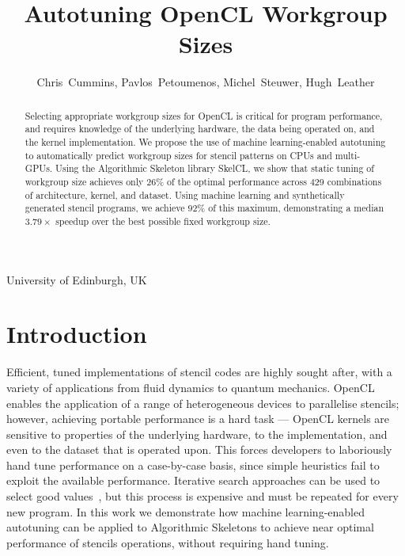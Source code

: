 \documentclass[hidelinks]{acaces}
\begin{document}
\title{Autotuning OpenCL Workgroup Sizes}

\author{
Chris~Cummins,
Pavlos~Petoumenos,
Michel~Steuwer,
Hugh~Leather
}

\address{1}{
University of Edinburgh,
UK
}

%

\pagestyle{empty}


\begin{abstract}
  Selecting appropriate workgroup sizes for OpenCL is critical for
  program performance, and requires knowledge of the underlying
  hardware, the data being operated on, and the kernel
  implementation. We propose the use of machine learning-enabled
  autotuning to automatically predict workgroup sizes for stencil
  patterns on CPUs and multi-GPUs. Using the Algorithmic Skeleton
  library SkelCL, we show that static tuning of workgroup size
  achieves only $26\%$ of the optimal performance across 429
  combinations of architecture, kernel, and dataset. Using machine
  learning and synthetically generated stencil programs, we achieve
  $92\%$ of this maximum, demonstrating a median $3.79\times$ speedup
  over the best possible fixed workgroup size.
\end{abstract}

\vspace{-.5em}

\vspace{-2em}
\section{Introduction}

Efficient, tuned implementations of stencil codes are highly sought
after, with a variety of applications from fluid dynamics to quantum
mechanics. OpenCL enables the application of a range of heterogeneous
devices to parallelise stencils; however, achieving portable
performance is a hard task --- OpenCL kernels are sensitive to
properties of the underlying hardware, to the implementation, and even
to the dataset that is operated upon. This forces developers to
laboriously hand tune performance on a case-by-case basis, since
simple heuristics fail to exploit the available performance. Iterative
search approaches can be used to select good
values~\cite{Nugteren2015,Ansel2013,Zhang2013a}, but this process is
expensive and must be repeated for every new program. In this work we
demonstrate how machine learning-enabled autotuning can be applied to
Algorithmic Skeletons to achieve near optimal performance of stencils
operations, without requiring hand tuning.
\end{document}
